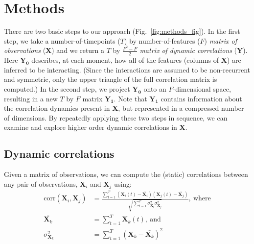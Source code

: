 \documentclass[english]{article}
\begin{document}
\section*{Methods}
There are two basic steps to our approach (Fig.~\ref{fig:methods_fig}).  In the first step, we take
a number-of-timepoints ($T$) by number-of-features ($F$)
\textit{matrix of observations} ($\mathbf{X}$) and we return a $T$ by
$\frac{F^2 - F}{2}$ \textit{matrix of dynamic correlations}
($\mathbf{Y}$).  Here $\mathbf{Y_0}$ describes, at each moment, how
all of the features (columns of $\mathbf{X}$) are inferred to be
interacting.  (Since the interactions are assumed to be non-recurrent
and symmetric, only the upper triangle of the full correlation matrix
is computed.)  In the second step, we project $\mathbf{Y_0}$ onto an
$F$-dimensional space, resulting in a new $T$ by $F$ matrix
$\mathbf{Y_1}$.  Note that $\mathbf{Y_1}$ contains information about
the correlation dynamics present in $\mathbf{X}$, but represented in a
compressed number of dimensions.  By repeatedly applying these two
steps in sequence, we can examine and explore higher order dynamic
correlations in $\mathbf{X}$.

\subsection*{Dynamic correlations}
Given a matrix of observations, we can compute the (static)
correlations between any pair of observations, $\mathbf{X}_i$ and
$\mathbf{X}_j$ using:
\begin{align}
  \mathrm{corr}(\mathbf{X}_i, \mathbf{X}_j) &= \frac{\sum_{t=1}^T \left(\mathbf{X}_i(t)
                                              -
                                              \bar{\mathbf{X}_i}\right) \left(\mathbf{X}_j(t)
                                              -
                                              \bar{\mathbf{X}_j}\right)}{\sqrt{\sum_{t=1}^T
                                              \sigma^2_{\mathbf{X}_i} 
                                              \sigma^2_{\mathbf{X}_j}}},~\mathrm{where}\\\label{eqn:corr}
  \bar{\mathbf{X}_k} &= \sum_{t=1}^T
                       \mathbf{X}_k(t),~\mathrm{and}\\
  \sigma^2_{\mathbf{X}_k} &= \sum_{t=1}^T \left( \mathbf{X}_k -
                            \bar{\mathbf{X}_k} \right)^2 
\end{align}
\end{document}
